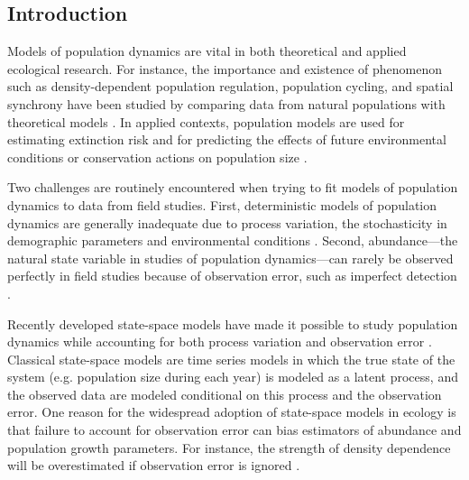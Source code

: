 \documentclass[12pt,english]{article}
\begin{document}
\begin{spacing}{1.9}
\begin{flushleft}

\section*{Introduction}
Models of population dynamics are vital in both theoretical and
applied ecological research. For instance, 
the importance and existence of phenomenon such as
density-dependent population regulation, population cycling, and
spatial synchrony have been studied by comparing data from natural
populations with theoretical models
\citep{may:1975,turchin:1990,bjornstad_etal:1999}. 
In applied contexts, population models are used for estimating extinction risk 
\citep{nadeem_lele:2011,hostetler_etal:2012} and for predicting the %
effects of future environmental conditions or conservation actions on
population size \citep{jamieson_brooks:2004,hatfield_etal:2012}.

Two challenges are routinely encountered when trying to fit models %
of population dynamics to data from field studies. 
First, deterministic models of population dynamics are generally inadequate due to process %
variation, the stochasticity in demographic parameters and environmental %
conditions \citep{bjornstad_grenfell:2001,saether_engen:2002}.
Second, abundance---the natural state variable in studies
of population dynamics---can rarely be observed perfectly in field
studies because of observation error, such as imperfect
detection \citep{link_nichols:1994,kery_etal:2009}.

Recently developed state-space models 
have made it possible to
study population dynamics while accounting for both process variation
and observation error \citep{devalpine_hastings:2002,
  buckland_etal:2004, dennis_etal:2006}. Classical state-space
models are time series models in which the true state of the
system (e.g. population size during each year) is modeled as a latent 
process, and the observed data are modeled conditional on this process
and the observation error. One reason for the widespread adoption of
state-space models in ecology is that failure to account for 
observation error can bias estimators of abundance and
population growth parameters. For instance, the strength of
density dependence will be overestimated if observation error is
ignored \citep{link_nichols:1994,shenk_etal:1998}.


\end{flushleft}
\end{spacing}
\end{document}
